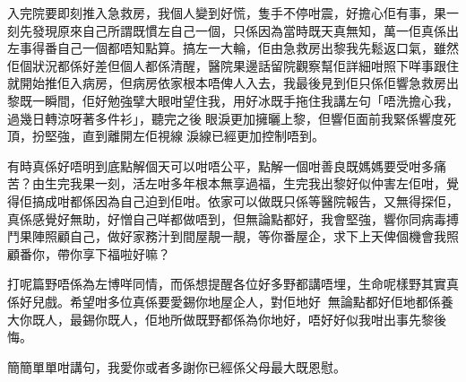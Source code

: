 入完院要即刻推入急救房，我個人變到好慌，隻手不停咁震，好擔心佢有事，果一刻先發現原來自己所謂既慣左自己一個，只係因為當時既天真無知，萬一佢真係出左事得番自己一個都唔知點算。搞左一大輪，佢由急救房出黎我先鬆返口氣，雖然佢個狀況都係好差但個人都係清醒，醫院果邊話留院觀察幫佢詳細咁照下咩事跟住就開始推佢入病房，但病房依家根本唔俾人入去，我最後見到佢只係佢響急救房出黎既一瞬間，佢好勉強擘大眼咁望住我，用好冰既手拖住我講左句「唔洗擔心我，過幾日轉涼呀著多件衫」，聽完之後眼淚更加擁曬上黎，但響佢面前我緊係響度死頂，扮堅強，直到離開左佢視線淚線已經更加控制唔到。

有時真係好唔明到底點解個天可以咁唔公平，點解一個咁善良既媽媽要受咁多痛苦？由生完我果一刻，活左咁多年根本無享過福，生完我出黎好似仲害左佢咁，覺得佢搞成咁都係因為自己迫到佢咁。依家可以做既只係等醫院報告，又無得探佢，真係感覺好無助，好憎自己咩都做唔到，但無論點都好，我會堅強，響你同病毒搏鬥果陣照顧自己，做好家務汁到間屋靚一靚，等你番屋企，求下上天俾個機會我照顧番你，帶你享下福啦好嘛？

打呢篇野唔係為左博咩同情，而係想提醒各位好多野都講唔埋，生命呢樣野其實真係好兒戲。希望咁多位真係要愛錫你地屋企人，對佢地好，無論點都好佢地都係養大你既人，最錫你既人，佢地所做既野都係為你地好，唔好好似我咁出事先黎後悔。

簡簡單單咁講句，我愛你或者多謝你已經係父母最大既恩慰。

